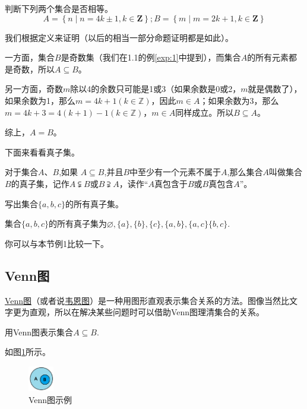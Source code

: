 \documentclass[lang=cn,math=cm,chinesefont=nofont,11pt,scheme=chinese,onecol]{elegantbook}
\begin{document}
\begin{example}\label{exp:2}
  判断下列两个集合是否相等。
  $$A=\left\{n\mid n=4k\pm1,k\in\mathbf{Z}\right\};B=\left\{m\mid m=2k+1,k\in\mathbf{Z}\right\}$$
\end{example}
\begin{solution}
  我们根据定义来证明（以后的相当一部分命题证明都是如此）。

一方面，集合$B$是奇数集（我们在1.1的例\ref{exp:1}中提到），而集合$A$的所有元素都是奇数，所以$A\subseteq B$。

另一方面，奇数$m$除以4的余数只可能是1或3（如果余数是0或2，$m$就是偶数了），如果余数为1，那么$m=4k+1(k\in\mathbb{Z})$，因此$m\in A$；如果余数为3，那么$m=4k+3=4(k+1)-1(k\in\mathbb{Z})$，$m\in A$同样成立。所以$B\subseteq A$。

综上，$A=B$。
\end{solution}

下面来看看真子集。
\begin{definition}[真子集]
  对于集合$A$、$B$,如果 $A\subseteq B$,并且$B$中至少有一个元素不属于$A$,那么集合$A$叫做集合$B$的真子集，记作$A\subsetneqq B$或$B\supsetneqq A$，读作“$A$真包含于$B$或$B$真包含$A$”。
\end{definition}

\begin{example}
  写出集合$\{a,b,c\}$的所有真子集。
\end{example}
\begin{solution}集合$\{a,b,c\}$的所有真子集为$\varnothing ,\{a\},\{b\},\{c\},\{a,b\},\{a,c\}\{b,c\}$.
\end{solution}

\begin{remark}
  你可以与本节例1比较一下。
\end{remark}

\subsection{Venn图}
  \underline{Venn图}（或者说\underline{韦恩图}）是一种用图形直观表示集合关系的方法。图像当然比文字更为直观，所以在解决某些问题时可以借助Venn图理清集合的关系。

\begin{example}
  用Venn图表示集合$A\subseteq B$.
\end{example}
\begin{solution}
  如图\ref{img:Venn1}所示。
\end{solution}
\begin{figure}[h]
  \centering
  \includegraphics[width=0.1\textwidth]{image/Venn1.png}
  \caption{Venn图示例}
  \label{img:Venn1}
\end{figure}
\end{document}
